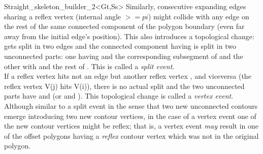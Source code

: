 \begin{ccRefClass}{Straight_skeleton_builder_2<Gt,Ss>}
Similarly, consecutive expanding edges  sharing a reflex vertex (internal angle $>=pi$) might collide with any edge  on the rest of the same connected component of the polygon boundary (even far away from the initial edge's position). This also introduces a topological change:  gets split in two edges and the connected component having  is split in two unconnected parts: one having  and the corresponding subsegment of  and the other with  and the rest of . This is called a {\em split event}.\\ If a reflex vertex hits not an edge  but another reflex vertex , and viceversa (the reflex vertex V(j) hits V(i)), there is no actual split and the two unconnected parts have  and  (or  and ). This topological change is called a {\em vertex event}. Although similar to a split event in the sense that two new unconnected contours emerge introducing two new contour vertices, in the case of a vertex event one of the new contour vertices might be reflex; that is, a vertex event \textit{may} result in one of the offset polygons having a \textit{reflex} contour vertex which was not in the original polygon.


\end{ccRefClass}
